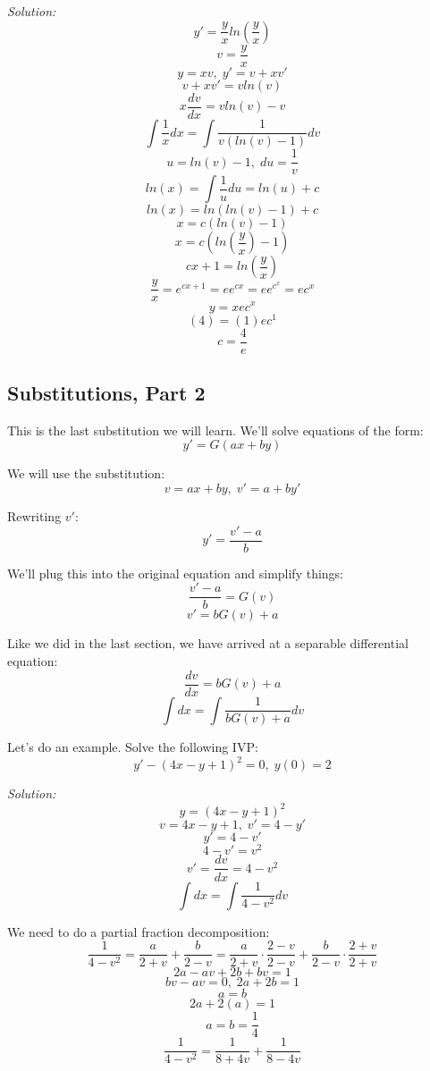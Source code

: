 \textit{Solution:}
$$y' = \frac{y}{x}ln\left(\frac{y}{x}\right)$$
$$v = \frac{y}{x}$$
$$y = xv,\;y' = v + xv'$$
$$v + xv' = vln(v)$$
$$x\frac{dv}{dx} = vln(v) - v$$
$$\int \frac{1}{x}dx = \int \frac{1}{v(ln(v) - 1)}dv$$
$$u = ln(v) - 1,\;du = \frac{1}{v}$$
$$ln(x) = \int \frac{1}{u}du = ln(u) + c$$
$$ln(x) = ln(ln(v) - 1) + c$$
$$x = c(ln(v) - 1)$$
$$x = c\left(ln\left(\frac{y}{x}\right) - 1\right)$$
$$cx + 1 = ln\left(\frac{y}{x}\right)$$
$$\frac{y}{x} = e^{cx + 1} = ee^{cx} = ee^{c^{x}} = ec^{x}$$
$$y = xec^{x}$$
$$(4) = (1)ec^{1}$$
$$c = \frac{4}{e}$$
\begin{center}
\end{center}

\subsection{Substitutions, Part 2}
This is the last substitution we will learn. We'll solve equations of the form:
$$y' = G(ax + by)$$

We will use the substitution:
$$v = ax + by,\;v' = a + by'$$

Rewriting $v'$:
$$y' = \frac{v' - a}{b}$$

We'll plug this into the original equation and simplify things:
$$\frac{v' - a}{b} = G(v)$$
$$v' = bG(v) + a$$

Like we did in the last section, we have arrived at a separable differential equation:
$$\frac{dv}{dx} = bG(v) + a$$
$$\int dx = \int \frac{1}{bG(v) + a}dv$$

Let's do an example. Solve the following IVP:
$$y' - (4x - y + 1)^{2} = 0,\;y(0) = 2$$

\textit{Solution:}
$$y = (4x - y + 1)^{2}$$
$$v = 4x - y + 1,\;v' = 4 - y'$$
$$y' = 4 - v'$$
$$4 - v' = v^{2}$$
$$v' = \frac{dv}{dx} = 4 - v^{2}$$
$$\int dx = \int \frac{1}{4 - v^{2}}dv$$

We need to do a partial fraction decomposition:
$$\frac{1}{4 - v^{2}} = \frac{a}{2 + v} + \frac{b}{2 - v} = \frac{a}{2 + v}\cdot\frac{2 - v}{2 - v} + \frac{b}{2 - v}\cdot\frac{2 + v}{2 + v}$$
$$2a - av + 2b + bv = 1$$
$$bv - av = 0,\;2a + 2b = 1$$
$$a = b$$
$$2a + 2(a) = 1$$
$$a = b = \frac{1}{4}$$
$$\frac{1}{4 - v^{2}} = \frac{1}{8 + 4v} + \frac{1}{8 - 4v}$$

